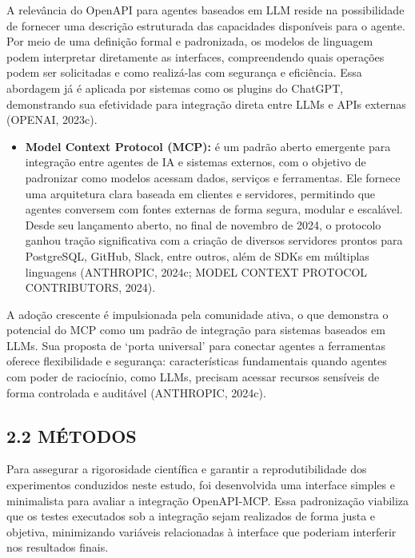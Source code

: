 \documentclass[
]{article}
\providecommand{\tightlist}{%
  \setlength{\itemsep}{0pt}\setlength{\parskip}{0pt}}
\begin{document}
A relevância do OpenAPI para agentes baseados em LLM reside na
possibilidade de fornecer uma descrição estruturada das capacidades
disponíveis para o agente. Por meio de uma definição formal e
padronizada, os modelos de linguagem podem interpretar diretamente as
interfaces, compreendendo quais operações podem ser solicitadas e como
realizá-las com segurança e eficiência. Essa abordagem já é aplicada por
sistemas como os plugins do ChatGPT, demonstrando sua efetividade para
integração direta entre LLMs e APIs externas (OPENAI, 2023c).

\begin{itemize}
\tightlist
\item
  \textbf{Model Context Protocol (MCP):} é um padrão aberto emergente
  para integração entre agentes de IA e sistemas externos, com o
  objetivo de padronizar como modelos acessam dados, serviços e
  ferramentas. Ele fornece uma arquitetura clara baseada em clientes e
  servidores, permitindo que agentes conversem com fontes externas de
  forma segura, modular e escalável. Desde seu lançamento aberto, no
  final de novembro de 2024, o protocolo ganhou tração significativa com
  a criação de diversos servidores prontos para PostgreSQL, GitHub,
  Slack, entre outros, além de SDKs em múltiplas linguagens (ANTHROPIC,
  2024c; MODEL CONTEXT PROTOCOL CONTRIBUTORS, 2024).
\end{itemize}

A adoção crescente é impulsionada pela comunidade ativa, o que demonstra
o potencial do MCP como um padrão de integração para sistemas baseados
em LLMs. Sua proposta de `porta universal' para conectar agentes a
ferramentas oferece flexibilidade e segurança: características
fundamentais quando agentes com poder de raciocínio, como LLMs, precisam
acessar recursos sensíveis de forma controlada e auditável (ANTHROPIC,
2024c).

\subsection{2.2 MÉTODOS}\label{muxe9todos}

Para assegurar a rigorosidade científica e garantir a reprodutibilidade
dos experimentos conduzidos neste estudo, foi desenvolvida uma interface
simples e minimalista para avaliar a integração OpenAPI-MCP. Essa
padronização viabiliza que os testes executados sob a integração sejam
realizados de forma justa e objetiva, minimizando variáveis relacionadas
à interface que poderiam interferir nos resultados finais.
\end{document}
